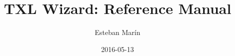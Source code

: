 \documentclass[12pt,a4paper]{article}
\begin{document}
\title{TXL Wizard: Reference Manual}
\author{Esteban Marín}
\date{2016-05-13}
\maketitle


\newpage
\tableofcontents
\pagestyle{headings}

\newpage







\end{document}
